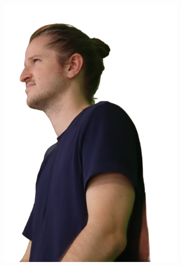 \begin{figure}
    \centering
    \begin{subfigure}{0.18\linewidth}
        \includegraphics[width=\textwidth]{Figures/results/splatfacto_ex/27_render.png}

\end{subfigure}
\end{figure}
